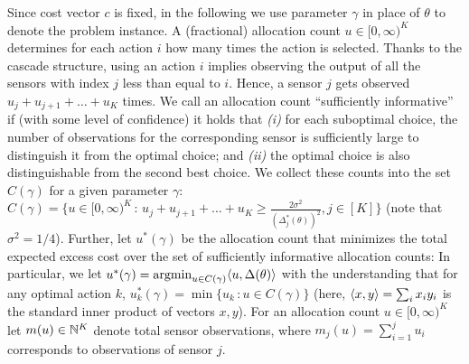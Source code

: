 Since cost vector $c$ is fixed, in the following we use parameter $\gamma$ in place of $\theta$ to denote the problem instance.
A (fractional) allocation count $u\in [0,\infty)^K$ determines for each action $i$ how many times the
action is selected.
Thanks to the cascade structure, using an action $i$ implies observing the output of all the sensors with index $j$ less than equal to $i$. Hence, a sensor $j$ gets observed $u_j+u_{j+1}+\dots+u_K$ times.
We call an allocation count ``sufficiently informative'' if (with some level of confidence)
it holds that {\em (i)} for each suboptimal choice, 
the number of observations for the corresponding sensor is sufficiently large to distinguish
it from the optimal choice; and  {\em (ii)}  the optimal choice is also distinguishable from the second best choice.
We collect these counts into the set $C(\gamma)$ for a given parameter $\gamma$:
$C(\gamma) = \{ u\in [0,\infty)^K\,:\, 
u_j+u_{j+1}+\dots+u_K
\ge \frac{2\sigma^2}{(\Delta_j^*(\theta))^2}, j\in [K] \}$
(note that $\sigma^2=1/4$).
Further, let $u^*(\gamma)$
be the allocation count that minimizes the total expected excess cost over the set of sufficiently informative allocation counts:
In particular,  we let $u^*(\gamma) = \operatorname{argmin}_{u\in C(\gamma)} \langle  u, \Delta(\theta)  \rangle$ 
with the understanding that for any optimal action $k$, $u_k^*(\gamma) = \min \{ u_k \,: u\in C(\gamma) \}$ (here, $\langle x,y \rangle = \sum_i x_i y_i$ is the standard inner product of vectors $x,y$).
For an allocation count $u\in [0,\infty)^K$ let $m(u)\in \mathbb{N}^K$ denote total sensor observations, where $m_j(u) = \sum_{i=1}^j u_i$ corresponds to observations of sensor $j$.

